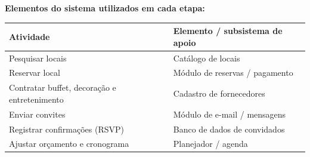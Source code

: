 \documentclass[11pt,a4paper]{article}
\begin{document}
\begin{resposta}
\begin{center}
\end{center}

\textbf{Elementos do sistema utilizados em cada etapa:}
\begin{center}\small
\begin{tabular}{@{}ll@{}}
\toprule
\textbf{Atividade} & \textbf{Elemento / subsistema de apoio} \\
\midrule
Pesquisar locais & Catálogo de locais \\
Reservar local & Módulo de reservas / pagamento \\
Contratar buffet, decoração e entretenimento & Cadastro de fornecedores \\
Enviar convites & Módulo de e-mail / mensagens \\
Registrar confirmações (RSVP) & Banco de dados de convidados \\
Ajustar orçamento e cronograma & Planejador / agenda \\
\bottomrule
\end{tabular}
\end{center}
\end{resposta}

\end{document}
